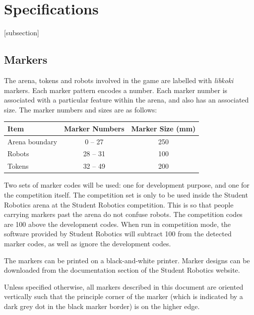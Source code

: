 \section{Specifications}
\label{sec:Specifications}

[subsection]
\newcommand{\rcnii}{\stepcounter{rulei}\arabic{section}.\arabic{subsection}.\arabic{rulei}}
\renewcommand{\labelenumi}{\rcnii}

\subsection{Markers}
\label{sub:markers}
The arena, tokens and robots involved in the game are labelled with \textit{libkoki} markers.
Each marker pattern encodes a number.
Each marker number is associated with a particular feature within the arena, and also has an associated size.
The marker numbers and sizes are as follows:

\begin{center}
  \begin{tabular}{lcc}
    \toprule
    \textbf{Item} & \textbf{Marker Numbers} & \textbf{Marker Size (mm)} \\
    \midrule
    Arena boundary & {} 0 -- 27 & 250 \\
    Robots & 28 -- 31 & 100 \\
    Tokens & 32 -- 49 & 200 \\
    \bottomrule
  \end{tabular}
\end{center}

Two sets of marker codes will be used: one for development purpose, and one for the competition itself.
The competition set is only to be used inside the Student Robotics arena at the Student Robotics competition.
This is so that people carrying markers past the arena do not confuse robots.
The competition codes are 100 above the development codes.
When run in competition mode, the software provided by Student Robotics will subtract 100 from the detected marker codes, as well as ignore the development codes.

The markers can be printed on a black-and-white printer.
Marker designs can be downloaded from the documentation section of the Student Robotics website.

Unless specified otherwise, all markers described in this document are oriented vertically such that the principle corner of the marker (which is indicated by a dark grey dot in the black marker border) is on the higher edge.


